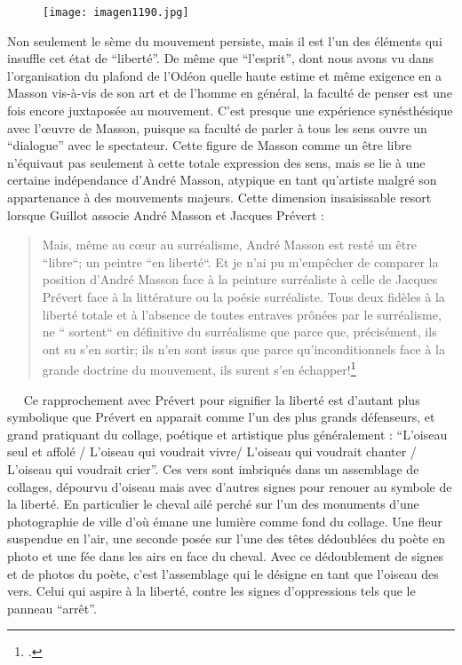 \begin{figure}[H]
   \centering
   \texttt{[image: imagen1190.jpg]}
	\caption{\cite{massonlyon}}\label{fig:MassonLyon}
\end{figure}

	Non seulement le sème du mouvement persiste, mais il est l’un des éléments qui insuffle cet état de \enquote{liberté}. De même que \enquote{l’esprit}, dont nous avons vu dans l’organisation du plafond de l’Odéon quelle haute estime et même exigence en a Masson vis-à-vis de son art et de l’homme en général, la faculté de penser est une fois encore juxtaposée au mouvement. C’est presque une expérience synésthésique avec l’\oe{}uvre de Masson, puisque sa faculté de parler à tous les sens ouvre un \enquote{dialogue} avec le spectateur. Cette figure de Masson comme un être libre n’équivaut pas seulement à cette totale expression des sens, mais se lie à une certaine indépendance d’André Masson, atypique en tant qu’artiste malgré son appartenance à des mouvements majeurs. Cette dimension insaisissable resort lorsque Guillot associe André Masson et Jacques Prévert : 
\begin{quote}
Mais, même au c\oe{}ur au surréalisme, André Masson est resté un être “libre“; un peintre “en liberté“. Et je n’ai pu m’empêcher de comparer la position d’André Masson face à la peinture surréaliste à celle de Jacques Prévert face à la littérature ou la poésie surréaliste. Tous deux fidèles à la liberté totale et à l’absence de toutes entraves prônées par le surréalisme, ne “ sortent“ en définitive du surréalisme que parce que, précisément, ils ont su s’en sortir; ils n’en sont issus que parce qu’inconditionnels face à la grande doctrine du mouvement, ils surent s’en échapper!\footcite{massonlyon}\end{quote}
  
Ce rapprochement avec Prévert pour signifier la liberté est d’autant plus symbolique que Prévert en apparait comme l’un des plus grands défenseurs, et grand pratiquant du collage, poétique et artistique plus généralement : \enquote{L’oiseau seul et affolé / L’oiseau qui voudrait vivre/ L’oiseau qui voudrait chanter / L’oiseau qui voudrait crier}. Ces vers sont imbriqués dans un assemblage de collages, dépourvu d’oiseau mais avec d’autres signes pour renouer au symbole de la liberté. En particulier le cheval ailé perché sur l’un des monuments d’une photographie de ville d’où émane une lumière comme fond du collage. Une fleur suspendue en l’air, une seconde posée sur l’une des têtes dédoublées du poète en photo et une fée dans les airs en face du cheval. Avec ce dédoublement de signes et de photos du poète, c’est l’assemblage qui le désigne en tant que l’oiseau des vers. Celui qui aspire à la liberté, contre les signes d’oppressions tels que le panneau \enquote{arrêt}. 

